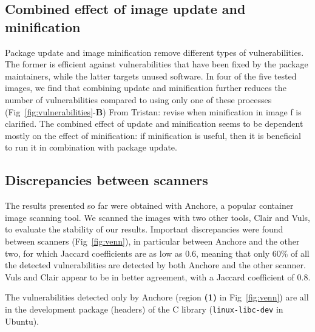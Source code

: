 \documentclass[a4paper,num-refs]{oup-contemporary}
\newcommand{\tristan}[1]{\color{blue}From Tristan: #1\color{black}}
\begin{document}
\subsection{Combined effect of image update and  minification}

Package update and image minification remove different types of
vulnerabilities. The former is efficient against vulnerabilities that have
been fixed by the package maintainers, while the latter targets unused
software. In four of the five tested images, we find that combining update
and minification further reduces the number of vulnerabilities compared to
using only one of these processes
(Fig~\ref{fig:vulnerabilities}-\textbf{B}) \tristan{revise when
minification in image f is clarified}. The combined effect of update and
minification seems to be dependent mostly on the effect of minification: if
minification is useful, then it is beneficial to run it in combination with
package update.

\subsection{Discrepancies between scanners}

The results presented so far were obtained with Anchore, a popular
container image scanning tool. We scanned the images with two other tools,
Clair and Vuls, to evaluate the stability of our results. Important
discrepancies were found between scanners (Fig~\ref{fig:venn}), in particular between Anchore
and the other two, for which Jaccard coefficients are as low as 0.6, meaning
that only 60\% of all the detected vulnerabilities are detected by both
Anchore and the other scanner. Vuls and Clair appear to be in better
agreement, with a Jaccard coefficient of 0.8.

The vulnerabilities detected only by Anchore (region
\textbf{(1)} in Fig~\ref{fig:venn}) are all in the development package
(headers) of the C library (\texttt{linux-libc-dev} in Ubuntu). 
\end{document}
